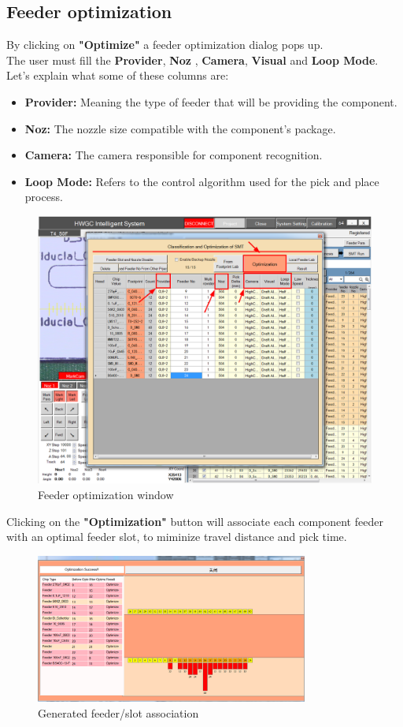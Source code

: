 \documentclass[a4paper,10pt]{report}
\begin{document}
\subsection{Feeder optimization}
By clicking on \textbf{"Optimize"} a feeder optimization dialog pops up.\\
The user must fill the \textbf{Provider}, \textbf{Noz} , \textbf{Camera}, \textbf{Visual} and \textbf{Loop Mode}. Let's explain what some of these columns are:
\begin{itemize}
 \item \textbf{Provider: } Meaning the type of feeder that will be providing the component.
 \item \textbf{Noz: } The nozzle size compatible with the component's package.
 \item \textbf{Camera: } The camera responsible for component recognition.
 \item \textbf{Loop Mode: } Refers to the control algorithm used for the pick and place process.
\end{itemize}
\begin{figure}[!htb]
 \centering
 \includegraphics[width=1\textwidth]{scrot18.png}
 \caption{Feeder optimization window}
\end{figure}
Clicking on the \textbf{"Optimization"} button will associate each component feeder with an optimal feeder slot, to miminize travel distance and pick time.
\newpage
\begin{figure}[!htb]
 \centering
 \includegraphics[width=0.8\textwidth]{scrot19.png}
 \caption{Generated feeder/slot association}
\end{figure}
\end{document}
